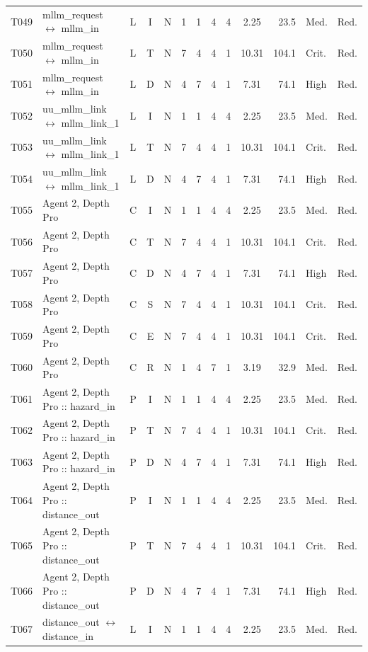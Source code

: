\documentclass[9pt]{extarticle}
\begin{document}
\begin{longtable}{l>{\raggedright\arraybackslash}p{6.3cm}ccccccccrll}
T049 & mllm\_request $\leftrightarrow$ mllm\_in & L & I & N & 1 & 1 & 4 & 4 & 2.25 & 23.5 & Med. & Red. \\
T050 & mllm\_request $\leftrightarrow$ mllm\_in & L & T & N & 7 & 4 & 4 & 1 & 10.31 & 104.1 & Crit. & Red. \\
T051 & mllm\_request $\leftrightarrow$ mllm\_in & L & D & N & 4 & 7 & 4 & 1 & 7.31 & 74.1 & High & Red. \\
T052 & uu\_mllm\_link $\leftrightarrow$ mllm\_link\_1 & L & I & N & 1 & 1 & 4 & 4 & 2.25 & 23.5 & Med. & Red. \\
T053 & uu\_mllm\_link $\leftrightarrow$ mllm\_link\_1 & L & T & N & 7 & 4 & 4 & 1 & 10.31 & 104.1 & Crit. & Red. \\
T054 & uu\_mllm\_link $\leftrightarrow$ mllm\_link\_1 & L & D & N & 4 & 7 & 4 & 1 & 7.31 & 74.1 & High & Red. \\
T055 & Agent 2, Depth Pro & C & I & N & 1 & 1 & 4 & 4 & 2.25 & 23.5 & Med. & Red. \\
T056 & Agent 2, Depth Pro & C & T & N & 7 & 4 & 4 & 1 & 10.31 & 104.1 & Crit. & Red. \\
T057 & Agent 2, Depth Pro & C & D & N & 4 & 7 & 4 & 1 & 7.31 & 74.1 & High & Red. \\
T058 & Agent 2, Depth Pro & C & S & N & 7 & 4 & 4 & 1 & 10.31 & 104.1 & Crit. & Red. \\
T059 & Agent 2, Depth Pro & C & E & N & 7 & 4 & 4 & 1 & 10.31 & 104.1 & Crit. & Red. \\
T060 & Agent 2, Depth Pro & C & R & N & 1 & 4 & 7 & 1 & 3.19 & 32.9 & Med. & Red. \\
T061 & Agent 2, Depth Pro :: hazard\_in & P & I & N & 1 & 1 & 4 & 4 & 2.25 & 23.5 & Med. & Red. \\
T062 & Agent 2, Depth Pro :: hazard\_in & P & T & N & 7 & 4 & 4 & 1 & 10.31 & 104.1 & Crit. & Red. \\
T063 & Agent 2, Depth Pro :: hazard\_in & P & D & N & 4 & 7 & 4 & 1 & 7.31 & 74.1 & High & Red. \\
T064 & Agent 2, Depth Pro :: distance\_out & P & I & N & 1 & 1 & 4 & 4 & 2.25 & 23.5 & Med. & Red. \\
T065 & Agent 2, Depth Pro :: distance\_out & P & T & N & 7 & 4 & 4 & 1 & 10.31 & 104.1 & Crit. & Red. \\
T066 & Agent 2, Depth Pro :: distance\_out & P & D & N & 4 & 7 & 4 & 1 & 7.31 & 74.1 & High & Red. \\
T067 & distance\_out $\leftrightarrow$ distance\_in & L & I & N & 1 & 1 & 4 & 4 & 2.25 & 23.5 & Med. & Red. \\

\end{longtable}
\end{document}
